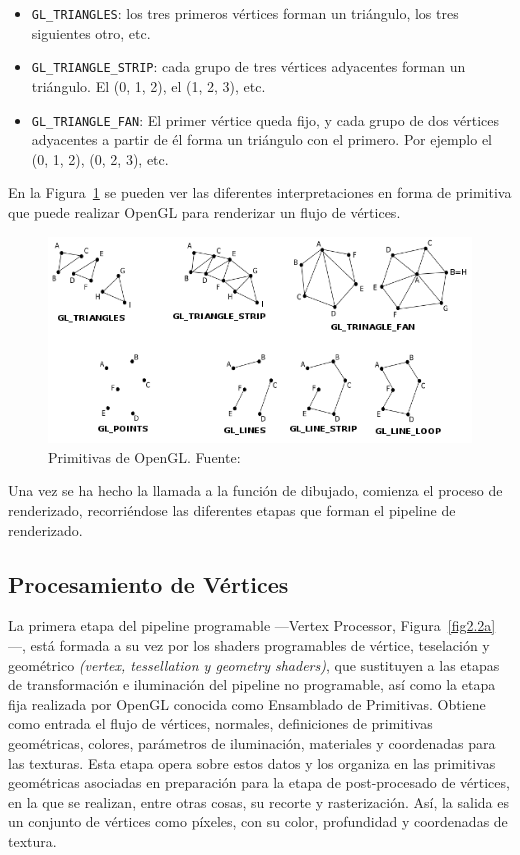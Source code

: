 \begin{itemize}
		\item \verb|GL_TRIANGLES|: los tres primeros vértices forman un
				triángulo, los tres siguientes otro, etc.
		\item \verb|GL_TRIANGLE_STRIP|: cada grupo de tres vértices adyacentes
				forman un triángulo. El (0, 1, 2), el (1, 2, 3), etc.
		\item \verb|GL_TRIANGLE_FAN|: El primer vértice queda fijo, y cada grupo
				de dos vértices adyacentes a partir de él forma un triángulo con
				el primero. Por ejemplo el (0, 1, 2), (0, 2, 3), etc.
\end{itemize}

En la Figura~\ref{fig:primitives} se pueden ver las diferentes interpretaciones
en forma de primitiva que puede realizar OpenGL para renderizar un flujo de
vértices. 

\begin{figure}[h]
	\centering	
	\includegraphics[width=\textwidth]{figures/primitives.png}
	\caption[Primitivas de OpenGL]{Primitivas de OpenGL.
	Fuente:~\cite{PrimitiveImage}}
	\label{fig:primitives}
\end{figure}

Una vez se ha hecho la llamada a la función de dibujado, comienza el proceso de
renderizado, recorriéndose las diferentes etapas que forman el pipeline de
renderizado. 

\subsection{Procesamiento de Vértices}
\label{ref:procesamiento}

La primera etapa del pipeline programable ---Vertex Processor,
Figura~\ref{fig2.2a}---, está formada a su vez por los shaders programables de
vértice, teselación y geométrico \textit{(vertex, tessellation y geometry
shaders)}, que sustituyen a las etapas de transformación e iluminación del
pipeline no programable, así como la etapa fija realizada por OpenGL conocida
como Ensamblado de Primitivas. Obtiene como entrada el flujo de vértices,
normales, definiciones de primitivas geométricas, colores, parámetros de
iluminación, materiales y coordenadas para las texturas. Esta etapa opera sobre
estos datos y los organiza en las primitivas geométricas asociadas en
preparación para la etapa de post-procesado de vértices, en la que se realizan,
entre otras cosas, su recorte y rasterización.  Así, la salida es un conjunto de
vértices como píxeles, con su color, profundidad y coordenadas de textura.

